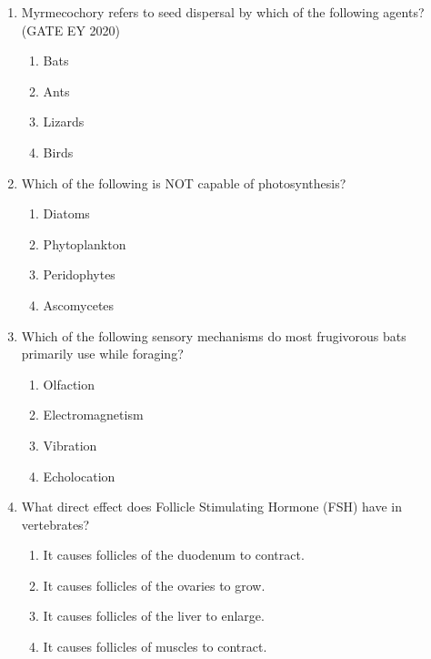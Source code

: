 \begin{enumerate}
\item Myrmecochory refers to seed dispersal by which of the following agents? \hfill {(GATE EY 2020)}

\begin{multicols}{2}
\begin{enumerate}
\item Bats
\item Ants
\item Lizards
\item Birds
\end{enumerate}
\end{multicols}

\item Which of the following is NOT capable of photosynthesis?
\begin{multicols}{2}
\begin{enumerate}
\item Diatoms
\item Phytoplankton
\item Peridophytes
\item Ascomycetes
\end{enumerate}
\end{multicols}

\item Which of the following sensory mechanisms do most frugivorous bats primarily use while foraging?
\begin{multicols}{2}
\begin{enumerate}
\item Olfaction
\item Electromagnetism
\item Vibration
\item Echolocation
\end{enumerate}
\end{multicols}

\item What direct effect does Follicle Stimulating Hormone (FSH) have in vertebrates?
\begin{multicols}{2}
\begin{enumerate}
\item It causes follicles of the duodenum to contract.
\item It causes follicles of the ovaries to grow.
\item It causes follicles of the liver to enlarge.
\item It causes follicles of muscles to contract.
\end{enumerate}
\end{multicols}


\end{enumerate}
